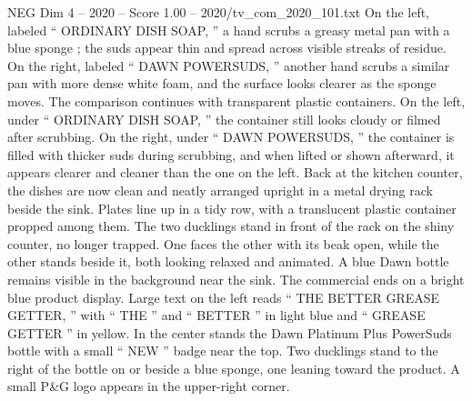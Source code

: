 \begin{textsample}{NEG Dim 4 – 2020 – Score 1.00 – 2020/tv\_com\_2020\_101.txt}
On the left, labeled “ ORDINARY DISH SOAP, ” a hand scrubs a greasy metal pan with a blue sponge ; the suds appear thin and spread across visible streaks of residue.
On the right, labeled “ DAWN POWERSUDS, ” another hand scrubs a similar pan with more dense white foam, and the surface looks clearer as the sponge moves.
The comparison continues with transparent plastic containers.
On the left, under “ ORDINARY DISH SOAP, ” the container still looks cloudy or filmed after scrubbing.
On the right, under “ DAWN POWERSUDS, ” the container is filled with thicker suds during scrubbing, and when lifted or shown afterward, it appears clearer and cleaner than the one on the left.
Back at the kitchen counter, the dishes are now clean and neatly arranged upright in a metal drying rack beside the sink.
Plates line up in a tidy row, with a translucent plastic container propped among them.
The two ducklings stand in front of the rack on the shiny counter, no longer trapped.
One faces the other with its beak open, while the other stands beside it, both looking relaxed and animated.
A blue Dawn bottle remains visible in the background near the sink.
The commercial ends on a bright blue product display.
Large text on the left reads “ THE BETTER GREASE GETTER, ” with “ THE ” and “ BETTER ” in light blue and “ GREASE GETTER ” in yellow.
In the center stands the Dawn Platinum Plus PowerSuds bottle with a small “ NEW ” badge near the top.
Two ducklings stand to the right of the bottle on or beside a blue sponge, one leaning toward the product.
A small P\&G logo appears in the upper-right corner.

\end{textsample}
